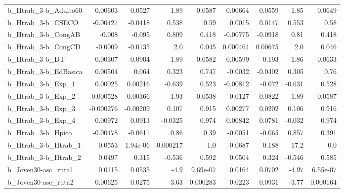 \begin{tabular}{lrrrrrrrr}
b\_Htrab\_3-b\_Adulto60       &     0.00603 &       0.0527 &      1.89 &   0.0587 &    0.00664 &      0.0559 &         1.85 &        0.0649 \\
b\_Htrab\_3-b\_CSECO          &    -0.00427 &      -0.0418 &     0.538 &     0.59 &     0.0015 &      0.0147 &        0.553 &          0.58 \\
b\_Htrab\_3-b\_CongAB         &      -0.008 &       -0.095 &     0.809 &    0.418 &   -0.00775 &     -0.0918 &         0.81 &         0.418 \\
b\_Htrab\_3-b\_CongCD         &     -0.0009 &      -0.0135 &       2.0 &    0.045 &   0.000464 &     0.00675 &          2.0 &         0.046 \\
b\_Htrab\_3-b\_DT             &    -0.00307 &      -0.0904 &      1.89 &   0.0582 &   -0.00599 &      -0.193 &         1.86 &        0.0633 \\
b\_Htrab\_3-b\_EdBasica       &     0.00504 &        0.064 &     0.323 &    0.747 &    -0.0032 &     -0.0402 &        0.305 &          0.76 \\
b\_Htrab\_3-b\_Exp\_1          &     0.00025 &      0.00216 &    -0.639 &    0.523 &   -0.00812 &      -0.072 &       -0.631 &         0.528 \\
b\_Htrab\_3-b\_Exp\_2          &    0.000528 &      0.00366 &     -1.93 &   0.0538 &     0.0127 &      0.0822 &        -1.89 &        0.0587 \\
b\_Htrab\_3-b\_Exp\_3          &   -0.000276 &     -0.00209 &     0.107 &    0.915 &    0.00277 &      0.0202 &        0.106 &         0.916 \\
b\_Htrab\_3-b\_Exp\_4          &     0.00972 &       0.0913 &   -0.0325 &    0.974 &    0.00842 &      0.0781 &       -0.032 &         0.974 \\
b\_Htrab\_3-b\_Hpico          &    -0.00478 &      -0.0611 &      0.86 &     0.39 &    -0.0051 &      -0.065 &        0.857 &         0.391 \\
b\_Htrab\_3-b\_Htrab\_1        &      0.0553 &     1.94e-06 &  0.000217 &      1.0 &     0.0687 &       0.188 &         17.2 &           0.0 \\
b\_Htrab\_3-b\_Htrab\_2        &      0.0497 &        0.315 &    -0.536 &    0.592 &     0.0504 &       0.324 &       -0.546 &         0.585 \\
b\_Joven30-asc\_ruta1        &      0.0115 &       0.0535 &      -4.9 & 9.69e-07 &     0.0164 &      0.0702 &        -4.97 &      6.55e-07 \\
b\_Joven30-asc\_ruta2        &     0.00625 &       0.0275 &     -3.63 & 0.000283 &     0.0223 &      0.0931 &        -3.77 &      0.000164 \\

\end{tabular}
